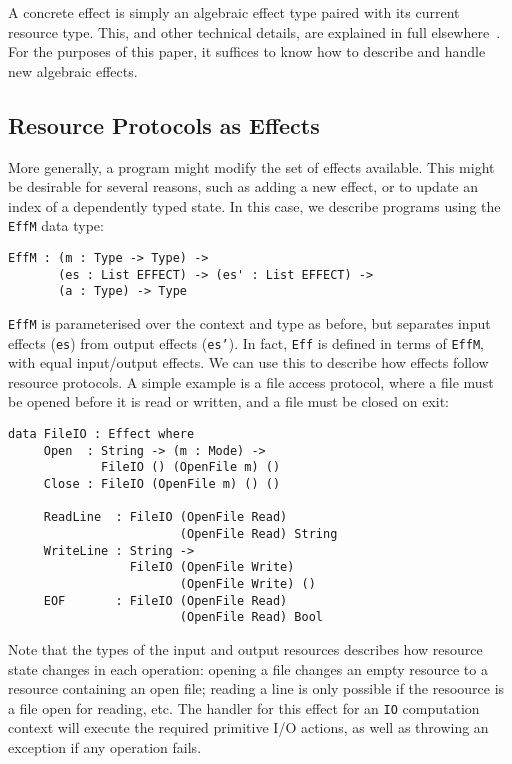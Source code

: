 \documentclass[preprint]{sigplanconf}
\begin{document}
A concrete effect is simply an algebraic effect type paired with its current
resource type. This, and other
technical details, are explained in full elsewhere~\cite{brady:effects}.
For the purposes of this paper, it suffices to know how to describe and
handle new algebraic effects.

\subsection{Resource Protocols as Effects}

More generally, a program might modify the set of effects available.
This might be desirable for several reasons, such as adding a new
effect, or to update an index of a dependently typed state. In this
case, we describe programs using the \texttt{EffM} data type:

\begin{Verbatim}
EffM : (m : Type -> Type) ->
       (es : List EFFECT) -> (es' : List EFFECT) ->
       (a : Type) -> Type
\end{Verbatim}

\texttt{EffM} is parameterised over the context and type as before, but
separates input effects (\texttt{es}) from output effects (\texttt{es'}). 
In fact, \texttt{Eff}
is defined in terms of \texttt{EffM}, with equal input/output effects.
We can use this to describe how effects follow resource protocols. A simple
example is a file access protocol, where a file must be opened before it
is read or written, and a file must be closed on exit:

\begin{Verbatim}
data FileIO : Effect where
     Open  : String -> (m : Mode) -> 
             FileIO () (OpenFile m) ()
     Close : FileIO (OpenFile m) () ()

     ReadLine  : FileIO (OpenFile Read)  
                        (OpenFile Read) String
     WriteLine : String -> 
                 FileIO (OpenFile Write) 
                        (OpenFile Write) ()
     EOF       : FileIO (OpenFile Read)  
                        (OpenFile Read) Bool
\end{Verbatim}

Note that the types of the input and output resources describes how resource
state changes in each operation: opening a file changes an empty resource to
a resource containing an open file; reading a line is only possible if the
resoource is a file open for reading, etc.
The handler for this effect for an \texttt{IO} computation context will
execute the required primitive I/O actions, as well as throwing an exception
if any operation fails.
\end{document}
